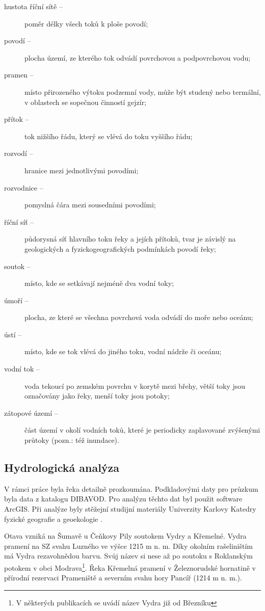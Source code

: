 \documentclass[thesis=M,czech]{FITthesis}[2012/06/26]
\begin{document}
\begin{description}
\item[hustota říční sítě –] poměr délky všech toků k ploše povodí;
\item[povodí –] plocha území, ze kterého tok odvádí povrchovou a podpovrchovou vodu;
\item[pramen –] místo přirozeného výtoku podzemní vody, může být studený nebo termální, v oblastech se sopečnou činností gejzír;
\item[přítok –] tok nižšího řádu, který se vlévá do toku vyššího řádu;
\item[rozvodí –] hranice mezi jednotlivými povodími;
\item[rozvodnice –] pomyslná čára mezi sousedními povodími;
\item[říční síť –] půdorysná síť hlavního toku řeky a jejích přítoků, tvar je závislý na geologických a fyzickogeografických podmínkách povodí řeky;
\item[soutok –] místo, kde se setkávají nejméně dva vodní toky;
\item[úmoří –] plocha, ze které se všechna povrchová voda odvádí do moře nebo oceánu;
\item[ústí –] místo, kde se tok vlévá do jiného toku, vodní nádrže či oceánu;
\item[vodní tok –] voda tekoucí po zemském povrchu v korytě mezi břehy, větší toky jsou označovány jako řeky, menší toky jsou potoky;
\item[zátopové území –] část území v okolí vodních toků, které je periodicky zaplavované zvýšenými průtoky (pozn.: též inundace).
\end{description}



\subsection{Hydrologická analýza}
V rámci práce byla řeka detailně prozkoumána. Podkladovými daty pro průzkum byla data z katalogu DIBAVOD. Pro analýzu těchto dat byl použit software ArcGIS. Při analýze byly stěžejní studijní materiály Univerzity Karlovy Katedry fyzické geografie a geoekologie \cite{UK}.


Otava vzniká na Šumavě u Čeňkovy Pily soutokem Vydry a Křemelné. Vydra pramení na SZ svahu Luzného ve výšce 1215 m n. m. Díky okolním rašeliništím má Vydra rezavohnědou barvu. Svůj název si nese až po soutoku s Roklanským potokem v obci Modrava\footnote{V některých publikacích se uvádí název Vydra již od Březníku}. Řeka Křemelná pramení v Železnorudské hornatině v přírodní rezervaci Prameniště a severním svahu hory Pancíř (1214 m n. m.). \cite{SMOOS}
\end{document}
